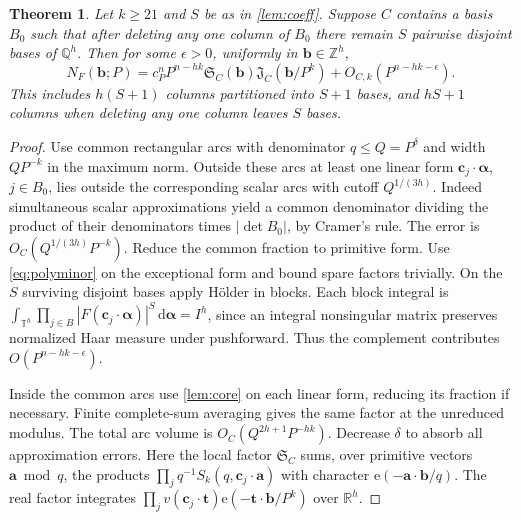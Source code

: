 \documentclass[11pt,letterpaper]{article}
\newtheorem{theorem}{Theorem}[section]
\theoremstyle{definition}
\newcommand{\Z}{\mathbb Z}
\newcommand{\R}{\mathbb R}
\newcommand{\T}{\mathbb T}
\newcommand{\e}{\mathrm e}
\newcommand{\dd}{\,\mathrm d}
\newcommand{\Si}{\mathfrak S}
\newcommand{\Ji}{\mathfrak J}
\begin{document}
\begin{theorem}\label{thm:matrix}
Let $k\ge21$ and $S$ be as in \cref{lem:coeff}. Suppose $C$ contains
a basis $B_0$ such that after deleting any one column of $B_0$ there
remain $S$ pairwise disjoint bases of $\mathbb Q^h$.
Then for some $\epsilon>0$, uniformly in $\mathbf b\in\Z^h$,
\[
 N_F(\mathbf b;P)=c_P^n P^{n-hk}
 \Si_C(\mathbf b)\Ji_C(\mathbf b/P^k)+O_{C,k}(P^{n-hk-\epsilon}).
\]
This includes $h(S+1)$ columns partitioned into $S+1$ bases, and
$hS+1$ columns when deleting any one column leaves $S$ bases.
\end{theorem}
\begin{proof}
Use common rectangular arcs with denominator $q\le Q=P^\delta$ and
width $QP^{-k}$ in the maximum norm. Outside these arcs at least one
linear form $\mathbf c_j\cdot\boldsymbol\alpha$, $j\in B_0$, lies
outside the corresponding scalar arcs with cutoff $Q^{1/(3h)}$.
Indeed simultaneous scalar approximations yield a common denominator
dividing the product of their denominators times $|\det B_0|$, by
Cramer's rule. The error is $O_C(Q^{1/(3h)}P^{-k})$. Reduce the common
fraction to primitive form. Use \eqref{eq:polyminor} on the exceptional
form and bound spare factors trivially. On the $S$ surviving disjoint
bases apply H\"older in blocks. Each block integral is
$\int_{\T^h}\prod_{j\in B}|F(\mathbf c_j\cdot\boldsymbol\alpha)|^S
\dd\boldsymbol\alpha=I^h$, since an integral nonsingular matrix
preserves normalized Haar measure under pushforward. Thus the
complement contributes $O(P^{n-hk-\epsilon})$.

Inside the common arcs use \cref{lem:core} on each linear form,
reducing its fraction if necessary. Finite complete-sum averaging gives
the same factor at the unreduced modulus. The total arc volume is
$O_C(Q^{2h+1}P^{-hk})$. Decrease $\delta$ to absorb all approximation
errors. Here the local factor $\Si_C$ sums, over primitive vectors
$\mathbf a\bmod q$, the products
$\prod_j q^{-1}S_k(q,\mathbf c_j\cdot\mathbf a)$ with character
$\e(-\mathbf a\cdot\mathbf b/q)$. The real factor integrates
$\prod_j v(\mathbf c_j\cdot\mathbf t)
\e(-\mathbf t\cdot\mathbf b/P^k)$ over $\R^h$.


\end{proof}
\end{document}
